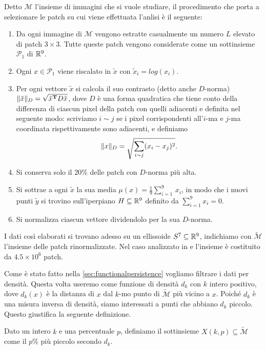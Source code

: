 Detto $\mathcal{M}$ l'insieme di immagini che si vuole studiare, il procedimento che porta a selezionare le patch su cui viene effettuata l'anlisi è il seguente:
\begin{enumerate}
  \item Da ogni immagine di $\mathcal{M}$ vengono estratte casualmente un numero $L$ elevato di patch $3\times 3$. Tutte queste patch vengono considerate come un sottinsieme $\mathcal{P}_1$ di $\mathbb{R}^9$.
  \item Ogni $x\in\mathcal{P}_1$ viene riscalato in $\tilde{x}$ con $\tilde{x}_i = log(x_i)$.
  \item Per ogni vettore $\tilde{x}$ si calcola il suo contrasto (detto anche $D$-norma) $\normD{\tilde{x}}=\sqrt{\tilde{x}^\mathbf{T}D\tilde{x}}$, dove $D$ è una forma quadratica che tiene conto della differenza di ciascun pixel della patch con quelli adiacenti e definita nel seguente modo: scriviamo $i\sim j$ se i pixel corrispondenti all'$i$-ma e $j$-ma coordinata rispettivamente sono adiacenti, e definiamo
  \begin{equation*}
    \normD{x} = \sqrt{\sum_{i\sim j}(x_i-x_j)^2}.
  \end{equation*}
  \item Si conserva solo il $20\%$ delle patch con $D$-norma più alta.
  \item Si sottrae a ogni $\tilde{x}$ la sua media $\mu(x)=\displaystyle\frac{1}{9}\sum_{i=1}^9\,x_i$, in modo che i nuovi punti $\tilde{y}$ si trovino sull'iperpiano $H\subseteq\mathbb{R}^9$ definito da $\sum_{i=1}^9 x_i =0$.
  \item Si normalizza ciascun vettore dividendolo per la sua $D$-norma.
\end{enumerate}

I dati così elaborati si trovano adesso su un ellissoide $S^7\subseteq\mathbb{R}^9$, indichiamo con $\widetilde{\mathcal{M}}$ l'insieme delle patch rinormalizzate. Nel caso analizzato in \cite{Lee2003} e \cite{Carlsson2008} l'insieme è costituito da $4.5 \times 10^6$ patch.

Come è stato fatto nella \cref{sec:functionalpersistence} vogliamo filtrare i dati per densità. Questa volta useremo come funzione di densità $d_k$ con $k$ intero positivo, dove $d_k(x)$ è la distanza di $x$ dal $k$-mo punto di $\widetilde{\mathcal{M}}$ più vicino a $x$. Poiché $d_k$ è una misura inversa di densità, siamo interessati a punti che abbiano $d_k$ piccolo. Questo giustifica la seguente definizione.

\begin{definition}
  Dato un intero $k$ e una percentuale $p$, definiamo il sottinsieme $X(k,p)\subseteq\widetilde{\mathcal{M}}$ come il $p\%$ più piccolo secondo $d_k$.
\end{definition}

